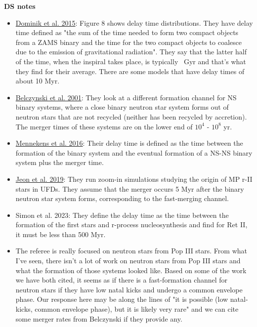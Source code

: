 \documentclass[11pt]{article}
\begin{document}
\noindent\textbf{DS notes}
\begin{itemize}
  \item \href{https://iopscience.iop.org/article/10.1088/0004-637X/759/1/52/pdf}{Dominik et al. 2015}: Figure 8 shows delay time distributions. They have delay time defined as "the sum of the time needed to form two compact objects from a ZAMS binary and the time for the two compact objects to coalesce due to the emission of gravitational radiation". They say that the latter half of the time, when the inspiral takes place, is typically ~Gyr and that's what they find for their average. There are some models that have delay times of about 10 Myr.
  \item \href{https://iopscience.iop.org/article/10.1086/319641/pdf}{Belczynski et al. 2001}: They look at a different formation channel for NS binary systems, where a close binary neutron star system forms out of neutron stars that are not recycled (neither has been recycled by accretion). The merger times of these systems are on the lower end of $10^4$ - $10^8$ yr.
  \item \href{https://www.aanda.org/articles/aa/pdf/2016/05/aa28193-16.pdf}{Mennekens et al. 2016}: Their delay time is defined as the time between the formation of the binary system and the eventual formation of a NS-NS binary system plus the merger time.
  \item \href{https://arxiv.org/pdf/2106.13383.pdf}{Jeon et al. 2019}: They run zoom-in simulations studying the origin of MP r-II stars in UFDs. They assume that the merger occurs 5 Myr after the binary neutron star system forms, corresponding to the fast-merging channel.
  \item Simon et al. 2023: They define the delay time as the time between the formation of the first stars and r-process nucleosynthesis and find for Ret II, it must be less than 500 Myr.
  \item The referee is really focused on neutron stars from Pop III stars. From what I've seen, there isn't a lot of work on neutron stars from Pop III stars and what the formation of those systems looked like. Based on some of the work we have both cited, it seems as if there is a fast-formation channel for neutron stars if they have low natal kicks and undergo a common envelope phase. Our response here may be along the lines of "it is possible (low natal-kicks, common envelope phase), but it is likely very rare" and we can cite some merger rates from Belczynski if they provide any.
\end{itemize}
\end{document}
